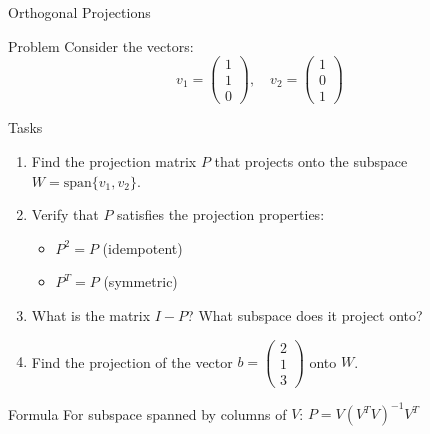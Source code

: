 \documentclass[aspectratio=1610]{beamer}
\begin{document}
\begin{frame}{Orthogonal Projections}

\begin{block}{Problem}
Consider the vectors:
$$v_1 = \begin{pmatrix} 1 \\ 1 \\ 0 \end{pmatrix}, \quad v_2 = \begin{pmatrix} 1 \\ 0 \\ 1 \end{pmatrix}$$
\end{block}

\begin{block}{Tasks}
\begin{enumerate}
\item Find the projection matrix $P$ that projects onto the subspace $W = \text{span}\{v_1, v_2\}$.

\item Verify that $P$ satisfies the projection properties:
\begin{itemize}
\item $P^2 = P$ (idempotent)
\item $P^T = P$ (symmetric)
\end{itemize}

\item What is the matrix $I - P$? What subspace does it project onto?

\item Find the projection of the vector $b = \begin{pmatrix} 2 \\ 1 \\ 3 \end{pmatrix}$ onto $W$.
\end{enumerate}
\end{block}

\begin{block}{Formula}
For subspace spanned by columns of $V$: $P = V(V^TV)^{-1}V^T$
\end{block}

\end{frame}
\end{document}
